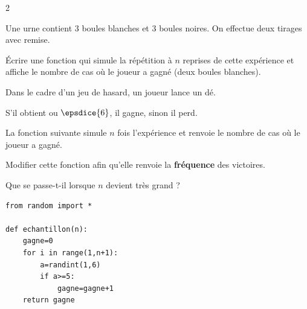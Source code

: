 {\begin{multicols}{2}
	  \begin{exo}{}
		  Une urne contient $3$ boules blanches et $3$ boules noires. On effectue deux tirages avec remise.

		  Écrire une fonction qui simule la répétition à $n$ reprises de cette expérience et affiche le nombre de cas où le joueur a gagné (deux boules blanches).
	  \end{exo}

	  \begin{exo}{}
		  Dans le cadre d'un jeu de hasard, un joueur lance un dé.

		  S'il obtient  ou $\epsdice{6}$, il gagne, sinon il perd.

		  La fonction suivante simule $n$ fois l'expérience et renvoie le nombre de cas où le joueur a gagné.

		  Modifier cette fonction afin qu'elle renvoie la \textbf{fréquence} des victoires.

		  Que se passe-t-il lorsque $n$ devient très grand ?
		  {\footnotesize
		  \begin{lstlisting}
from random import *

def echantillon(n):
    gagne=0
    for i in range(1,n+1):
        a=randint(1,6)
        if a>=5:
            gagne=gagne+1
    return gagne
\end{lstlisting}
		  }
	  \end{exo}
	  \vfill~

  \end{multicols}
 }

